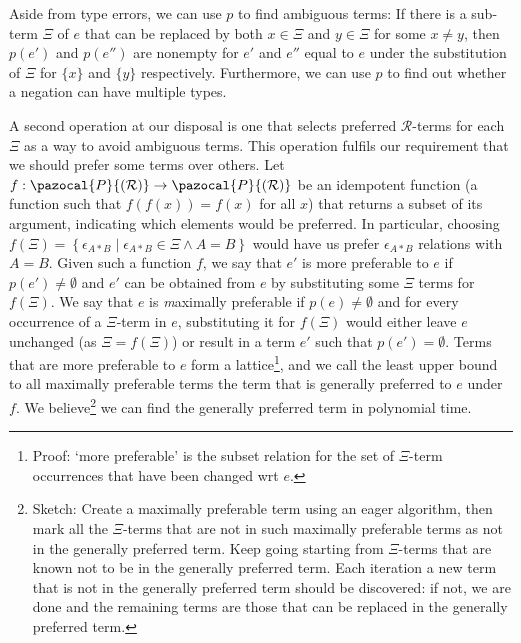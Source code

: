\documentclass[12pt]{article}
\newcommand{\powerset}{\pazocal{P}}
\begin{document}
Aside from type errors, we can use $p$ to find ambiguous terms:
If there is a sub-term $\Xi$ of $e$ that can be replaced by both $x\in \Xi$ and $y\in \Xi$ for some $x \neq y$, then $p(e')$ and $p(e'')$ are nonempty for $e'$ and $e''$ equal to $e$ under the substitution of $\Xi$ for $\{x\}$ and $\{y\}$ respectively.
Furthermore, we can use $p$ to find out whether a negation can have multiple types.

A second operation at our disposal is one that selects preferred $\mathcal{R}$-terms for each $\Xi$ as a way to avoid ambiguous terms.
This operation fulfils our requirement that we should prefer some terms over others.
Let $f : \powerset{(\mathcal{R})}\to\powerset{(\mathcal{R})}$ be an idempotent function (a function such that $f(f(x))=f(x)$ for all $x$) that returns a subset of its argument, indicating which elements would be preferred.
In particular, choosing $f(\Xi) = \left\{\epsilon_{A*B} \mid \epsilon_{A*B}\in \Xi \wedge A=B\right\}$ would have us prefer $\epsilon_{A*B}$ relations with $A=B$.
Given such a function $f$, we say that $e'$ is more preferable to $e$ if $p(e')\neq \emptyset$ and $e'$ can be obtained from $e$ by substituting some $\Xi$ terms for $f(\Xi)$.
We say that $e$ is {\emph maximally preferable} if $p(e)\neq \emptyset$ and for every occurrence of a $\Xi$-term in $e$, substituting it for $f(\Xi)$ would either leave $e$ unchanged (as $\Xi=f(\Xi)$) or result in a term $e'$ such that $p(e')=\emptyset$.
Terms that are more preferable to $e$ form a lattice\footnote{Proof: `more preferable' is the subset relation for the set of $\Xi$-term occurrences that have been changed wrt $e$.}, and we call the least upper bound to all maximally preferable terms the term that is generally preferred to $e$ under $f$.
We believe\footnote{Sketch: Create a maximally preferable term using an eager algorithm, then mark all the $\Xi$-terms that are not in such maximally preferable terms as not in the generally preferred term. Keep going starting from $\Xi$-terms that are known not to be in the generally preferred term. Each iteration a new term that is not in the generally preferred term should be discovered: if not, we are done and the remaining terms are those that can be replaced in the generally preferred term.} we can find the generally preferred term in polynomial time.
\end{document}
